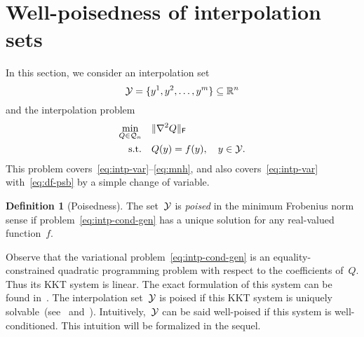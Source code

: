 \documentclass{article}
\numberwithin{equation}{section}
\theoremstyle{definition}
\newtheorem{definition}{Definition}[section]
\theoremstyle{plain}
\theoremstyle{remark}
\newcommand*{\norm}[2][]{#1\lVert#2#1\rVert}
\newcommand*{\obj}{f}
\newcommand*{\objm}[1][]{\hat{\obj}\ifblank{#1}{}{^{#1}}}
\newcommand*{\qpoly}{\mathcal{Q}_n}
\newcommand*{\R}{\mathbb{R}}
\newcommand*{\set}[2][]{#1\{#2#1\}}
\newcommand*{\xpt}[1][]{\mathcal{Y}\ifblank{#1}{}{^{#1}}}
\begin{document}
\section{Well-poisedness of interpolation sets}
\label{sec:well-poisedness}

In this section, we consider an interpolation set
\begin{equation*}
    \xpt = \set{y^1, y^2, \dots, y^m} \subseteq \R^n
\end{equation*}
and the interpolation problem
\begin{equation}
    \label{eq:intp-cond-gen}
    \begin{aligned}
        \min_{Q \in \qpoly} & \quad \norm{\nabla^2 Q}_\textsf{F}\\
        \text{s.t.}         & \quad Q(y) = \obj(y), \quad y \in \xpt.
    \end{aligned}
\end{equation}
This problem covers~\eqref{eq:intp-var}--\eqref{eq:mnh}, and also covers~\eqref{eq:intp-var} with~\eqref{eq:df-psb} by a simple change of variable.


\begin{definition}[Poisedness]
    The set~$\xpt$ is \emph{poised} in the minimum Frobenius norm sense if problem~\eqref{eq:intp-cond-gen} has a unique solution for any real-valued function~$\obj$.
\end{definition}

Observe that the variational problem~\eqref{eq:intp-cond-gen} is an equality-constrained quadratic
programming problem with respect to the coefficients of~$Q$. Thus its KKT system is linear.
The exact formulation of this system can be found in~\cite{Powell_2004a,Powell_2004b}.
The interpolation set~$\xpt$ is poised if this KKT system is uniquely solvable~(see~\mbox{\cite[\S~2]{Powell_2004a}} and~\cite[\S~5.3]{Conn_Scheinberg_Vicente_2009}).
Intuitively,~$\xpt$ can be said well-poised if this system is well-conditioned.
This intuition will be formalized in the sequel.
\end{document}
